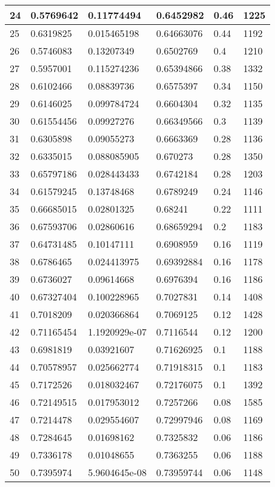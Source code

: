 \begin{longtable}{|l|l|l|l|l|l|}
24 & 0.5769642 & 0.11774494 & 0.6452982 & 0.46 & 1225 \\ \hline 
25 & 0.6319825 & 0.015465198 & 0.64663076 & 0.44 & 1192 \\ \hline 
26 & 0.5746083 & 0.13207349 & 0.6502769 & 0.4 & 1210 \\ \hline 
27 & 0.5957001 & 0.115274236 & 0.65394866 & 0.38 & 1332 \\ \hline 
28 & 0.6102466 & 0.08839736 & 0.6575397 & 0.34 & 1150 \\ \hline 
29 & 0.6146025 & 0.099784724 & 0.6604304 & 0.32 & 1135 \\ \hline 
30 & 0.61554456 & 0.09927276 & 0.66349566 & 0.3 & 1139 \\ \hline 
31 & 0.6305898 & 0.09055273 & 0.6663369 & 0.28 & 1136 \\ \hline 
32 & 0.6335015 & 0.088085905 & 0.670273 & 0.28 & 1350 \\ \hline 
33 & 0.65797186 & 0.028443433 & 0.6742184 & 0.28 & 1203 \\ \hline 
34 & 0.61579245 & 0.13748468 & 0.6789249 & 0.24 & 1146 \\ \hline 
35 & 0.66685015 & 0.02801325 & 0.68241 & 0.22 & 1111 \\ \hline 
36 & 0.67593706 & 0.02860616 & 0.68659294 & 0.2 & 1183 \\ \hline 
37 & 0.64731485 & 0.10147111 & 0.6908959 & 0.16 & 1119 \\ \hline 
38 & 0.6786465 & 0.024413975 & 0.69392884 & 0.16 & 1178 \\ \hline 
39 & 0.6736027 & 0.09614668 & 0.6976394 & 0.16 & 1186 \\ \hline 
40 & 0.67327404 & 0.100228965 & 0.7027831 & 0.14 & 1408 \\ \hline 
41 & 0.7018209 & 0.020366864 & 0.7069125 & 0.12 & 1428 \\ \hline 
42 & 0.71165454 & 1.1920929e-07 & 0.7116544 & 0.12 & 1200 \\ \hline 
43 & 0.6981819 & 0.03921607 & 0.71626925 & 0.1 & 1188 \\ \hline 
44 & 0.70578957 & 0.025662774 & 0.71918315 & 0.1 & 1183 \\ \hline 
45 & 0.7172526 & 0.018032467 & 0.72176075 & 0.1 & 1392 \\ \hline 
46 & 0.72149515 & 0.017953012 & 0.7257266 & 0.08 & 1585 \\ \hline 
47 & 0.7214478 & 0.029554607 & 0.72997946 & 0.08 & 1169 \\ \hline 
48 & 0.7284645 & 0.01698162 & 0.7325832 & 0.06 & 1186 \\ \hline 
49 & 0.7336178 & 0.01048655 & 0.7363255 & 0.06 & 1188 \\ \hline 
50 & 0.7395974 & 5.9604645e-08 & 0.73959744 & 0.06 & 1148 \\ \hline 
\end{longtable}
